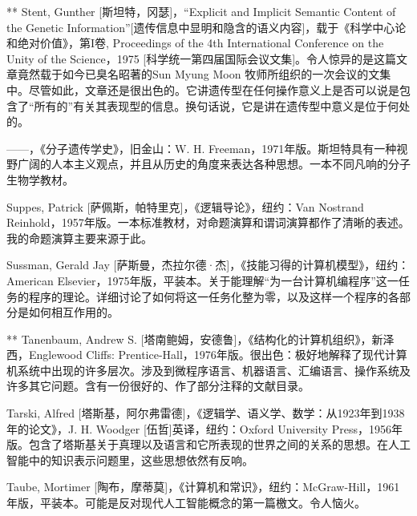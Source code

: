 \begin{thebib}
\begin{biblist}
\item[**] Stent, Gunther [斯坦特，冈瑟]，“Explicit and Implicit Semantic Content of the Genetic Information”[遗传信息中显明和隐含的语义内容]，载于《科学中心论和绝对价值》，第I卷, Proceedings of the 4th International Conference on the Unity of the Science，1975 [科学统一第四届国际会议文集]。令人惊异的是这篇文章竟然载于如今已臭名昭著的Sun Myung Moon 牧师所组织的一次会议的文集中。尽管如此，文章还是很出色的。它讲遗传型在任何操作意义上是否可以说是包含了“所有的”有关其表现型的信息。换句话说，它是讲在遗传型中意义是位于何处的。

\item ——，《分子遗传学史》，旧金山：W. H. Freeman，1971年版。斯坦特具有一种视野广阔的人本主义观点，并且从历史的角度来表达各种思想。一本不同凡响的分子生物学教材。

\item Suppes, Patrick [萨佩斯，帕特里克]，《逻辑导论》，纽约：Van Nostrand Reinhold，1957年版。一本标准教材，对命题演算和谓词演算都作了清晰的表述。我的命题演算主要来源于此。

\item Sussman, Gerald Jay [萨斯曼，杰拉尔德·杰]，《技能习得的计算机模型》，纽约：American Elsevier，1975年版，平装本。关于能理解“为一台计算机编程序”这一任务的程序的理论。详细讨论了如何将这一任务化整为零，以及这样一个程序的各部分是如何相互作用的。

\item[**] Tanenbaum, Andrew S. [塔南鲍姆，安德鲁]，《结构化的计算机组织》，新泽西，Englewood Cliffs: Prentice-Hall，1976年版。很出色：极好地解释了现代计算机系统中出现的许多层次。涉及到微程序语言、机器语言、汇编语言、操作系统及许多其它问题。含有一份很好的、作了部分注释的文献目录。

\item Tarski, Alfred [塔斯基，阿尔弗雷德]，《逻辑学、语义学、数学：从1923年到1938年的论文》，J. H. Woodger [伍哲]英译，纽约：Oxford University Press，1956年版。包含了塔斯基关于真理以及语言和它所表现的世界之间的关系的思想。在人工智能中的知识表示问题里，这些思想依然有反响。

\item Taube, Mortimer [陶布，摩蒂莫]，《计算机和常识》，纽约：McGraw-Hill，1961年版，平装本。可能是反对现代人工智能概念的第一篇檄文。令人恼火。


\end{biblist}
\end{thebib}
